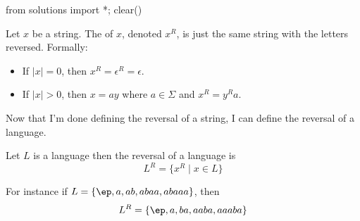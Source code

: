 \begin{python0}
from solutions import *; clear()
\end{python0}

\begin{defn}
Let $x$ be a string. The  of $x$, denoted $x^R$,
is just the same string with the letters reversed. Formally:
\begin{itemize}
 \item If $|x|=0$, then $x^R = \epsilon^R = \epsilon$.
 \item If $|x|>0$, then $x = ay$ where $a \in \Sigma$ and $x^R =
 y^Ra$.
\end{itemize}
\end{defn}




\newpage
Now that I'm done defining the reversal of a string, I can
define the reversal of a language.

\begin{defn}
Let $L$ is a language then the reversal of a language is
\[
L^R = \{x^R \mid x \in L \}
\]
\end{defn}

For instance if $L = \{\ep, a, ab, abaa, abaaa\}$, then
\[
L^R = \{ \ep, a, ba, aaba, aaaba \}
\]
